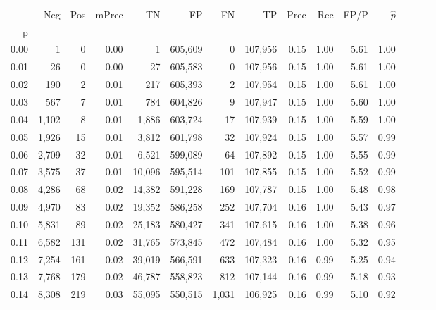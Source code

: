 \begin{tabular}{rrrrrrrrrrrrrrr}
\toprule
{} &     Neg &    Pos & mPrec &       TN &       FP &       FN &       TP &  Prec &   Rec &  FP/P & $\hat{p}$ \\
p    &         &        &       &          &          &          &          &       &       &       &           \\
\midrule
0.00 &       1 &      0 &  0.00 &        1 &  605,609 &        0 &  107,956 &  0.15 &  1.00 &  5.61 &      1.00 \\
0.01 &      26 &      0 &  0.00 &       27 &  605,583 &        0 &  107,956 &  0.15 &  1.00 &  5.61 &      1.00 \\
0.02 &     190 &      2 &  0.01 &      217 &  605,393 &        2 &  107,954 &  0.15 &  1.00 &  5.61 &      1.00 \\
0.03 &     567 &      7 &  0.01 &      784 &  604,826 &        9 &  107,947 &  0.15 &  1.00 &  5.60 &      1.00 \\
0.04 &   1,102 &      8 &  0.01 &    1,886 &  603,724 &       17 &  107,939 &  0.15 &  1.00 &  5.59 &      1.00 \\
0.05 &   1,926 &     15 &  0.01 &    3,812 &  601,798 &       32 &  107,924 &  0.15 &  1.00 &  5.57 &      0.99 \\
0.06 &   2,709 &     32 &  0.01 &    6,521 &  599,089 &       64 &  107,892 &  0.15 &  1.00 &  5.55 &      0.99 \\
0.07 &   3,575 &     37 &  0.01 &   10,096 &  595,514 &      101 &  107,855 &  0.15 &  1.00 &  5.52 &      0.99 \\
0.08 &   4,286 &     68 &  0.02 &   14,382 &  591,228 &      169 &  107,787 &  0.15 &  1.00 &  5.48 &      0.98 \\
0.09 &   4,970 &     83 &  0.02 &   19,352 &  586,258 &      252 &  107,704 &  0.16 &  1.00 &  5.43 &      0.97 \\
0.10 &   5,831 &     89 &  0.02 &   25,183 &  580,427 &      341 &  107,615 &  0.16 &  1.00 &  5.38 &      0.96 \\
0.11 &   6,582 &    131 &  0.02 &   31,765 &  573,845 &      472 &  107,484 &  0.16 &  1.00 &  5.32 &      0.95 \\
0.12 &   7,254 &    161 &  0.02 &   39,019 &  566,591 &      633 &  107,323 &  0.16 &  0.99 &  5.25 &      0.94 \\
0.13 &   7,768 &    179 &  0.02 &   46,787 &  558,823 &      812 &  107,144 &  0.16 &  0.99 &  5.18 &      0.93 \\
0.14 &   8,308 &    219 &  0.03 &   55,095 &  550,515 &    1,031 &  106,925 &  0.16 &  0.99 &  5.10 &      0.92 \\

\end{tabular}

